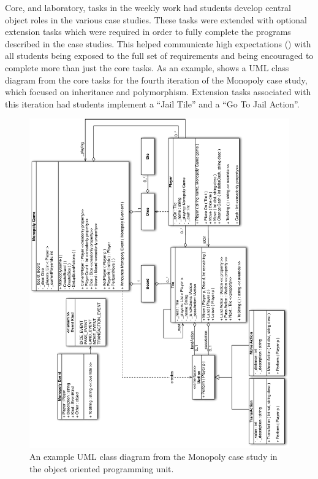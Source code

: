 Core, and laboratory, tasks in the weekly work had students develop central object roles in the various case studies. These tasks were extended with optional extension tasks which were required in order to fully complete the programs described in the case studies. This helped communicate high expectations () with all students being exposed to the full set of requirements and being encouraged to complete more than just the core tasks. As an example,  shows a UML class diagram from the core tasks for the fourth iteration of the Monopoly case study, which focused on inheritance and polymorphism. Extension tasks associated with this iteration had students implement a ``Jail Tile'' and a ``Go To Jail Action''.


\begin{figure}[p]
	\centering
	\includegraphics[width=\textwidth]{Monopoly1}
	\caption{An example UML class diagram from the Monopoly case study in the object oriented programming unit. }
	\label{fig:monopoly}
\end{figure}


